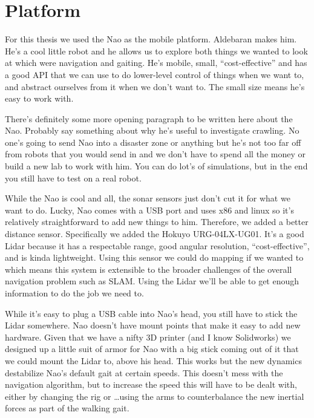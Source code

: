 \chapter{Platform}\label{ch:platform}

For this thesis we used the Nao as the mobile platform. Aldebaran makes him.
He's a cool little robot and he allows us to explore both things we wanted to 
look at which were navigation and gaiting. He's mobile, small, ``cost-effective''
and has a good API that we can use to do lower-level control of things when we want to, 
and abstract ourselves from it when we don't want to.
The small size means he's easy to work with.

There's definitely some more opening paragraph to be written here about the Nao.
Probably say something about why he's useful to investigate crawling.
No one's going to send Nao into a disaster zone or anything but he's not too
far off from robots that you would send in and we don't have to spend all the 
money or build a new lab to work with him. You can do lot's of simulations, 
but in the end you still have to test on a real robot.

While the Nao is cool and all, the sonar sensors just don't cut it for what we want to do.
Lucky, Nao comes with a USB port and uses x86 and linux so it's relatively
straightforward to add new things to him. Therefore, we added a better distance sensor.
Specifically we added the Hokuyo URG-04LX-UG01.
It's a good Lidar because it has a respectable range, good angular resolution,
``cost-effective'', and is kinda lightweight. Using this sensor we could do mapping 
if we wanted to which means this system is extensible to the broader challenges 
of the overall navigation problem such as SLAM\@. Using the Lidar we'll be able to 
get enough information to do the job we need to.

While it's easy to plug a USB cable into Nao's head, you still have to stick the Lidar somewhere.
Nao doesn't have mount points that make it easy to add new hardware.
Given that we have a nifty 3D printer (and I know Solidworks) we designed up a little suit of
armor for Nao with a big stick coming out of it that we could mount the Lidar to, above his head.
This works but the new dynamics destabilize Nao's default gait at certain speeds. 
This doesn't mess with the navigation algorithm, but to increase the speed this will have to be dealt with,
either by changing the rig or \ldots using the arms to counterbalance the new inertial forces as
part of the walking gait.

